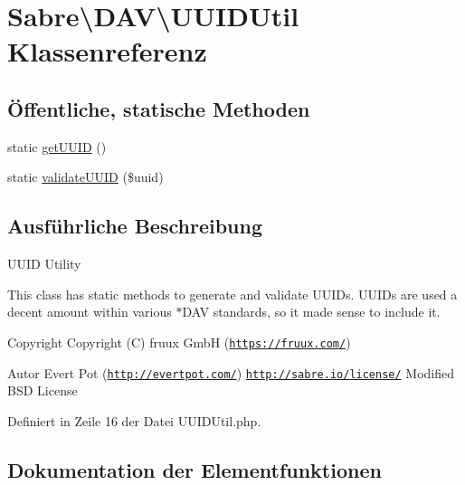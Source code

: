 \hypertarget{class_sabre_1_1_d_a_v_1_1_u_u_i_d_util}{}\section{Sabre\textbackslash{}D\+AV\textbackslash{}U\+U\+I\+D\+Util Klassenreferenz}
\label{class_sabre_1_1_d_a_v_1_1_u_u_i_d_util}
\subsection*{Öffentliche, statische Methoden}
\begin{DoxyCompactItemize}
\item 
static \mbox{\hyperlink{class_sabre_1_1_d_a_v_1_1_u_u_i_d_util_afd037e36233af098d57414f27aa8e449}{get\+U\+U\+ID}} ()
\item 
static \mbox{\hyperlink{class_sabre_1_1_d_a_v_1_1_u_u_i_d_util_a78de4443f0efff2f057075ce1bf52176}{validate\+U\+U\+ID}} (\$uuid)
\end{DoxyCompactItemize}


\subsection{Ausführliche Beschreibung}
U\+U\+ID Utility

This class has static methods to generate and validate U\+U\+ID\textquotesingle{}s. U\+U\+I\+Ds are used a decent amount within various $\ast$\+D\+AV standards, so it made sense to include it.

\begin{DoxyCopyright}{Copyright}
Copyright (C) fruux GmbH (\href{https://fruux.com/}{\tt https\+://fruux.\+com/}) 
\end{DoxyCopyright}
\begin{DoxyAuthor}{Autor}
Evert Pot (\href{http://evertpot.com/}{\tt http\+://evertpot.\+com/})  \href{http://sabre.io/license/}{\tt http\+://sabre.\+io/license/} Modified B\+SD License 
\end{DoxyAuthor}


Definiert in Zeile 16 der Datei U\+U\+I\+D\+Util.\+php.



\subsection{Dokumentation der Elementfunktionen}
\mbox{\label{class_sabre_1_1_d_a_v_1_1_u_u_i_d_util_afd037e36233af098d57414f27aa8e449}} 
